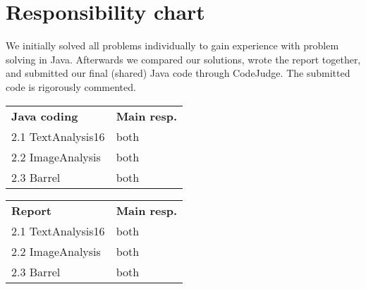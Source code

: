 \section*{Responsibility chart}

We initially solved all problems individually to gain experience with problem solving in Java. Afterwards we compared our solutions, wrote the report together, and submitted our final (shared) Java code through CodeJudge. The submitted code is  rigorously commented.

\begin{multicols}{2}

\begin{table}[H]
    \begin{tabular}{ll}
    \textbf{Java coding}      & \textbf{Main resp.} \\
    2.1 TextAnalysis16 & both       \\
    2.2 ImageAnalysis & both        \\
    2.3 Barrel  & both              \\
    \end{tabular}
\end{table}

\begin{table}[H]
    \begin{tabular}{ll}
    \textbf{Report}      & \textbf{Main resp.} \\
    2.1 TextAnalysis16 & both       \\
    2.2 ImageAnalysis & both        \\
    2.3 Barrel  & both              \\
    \end{tabular}
\end{table}

\end{multicols}

